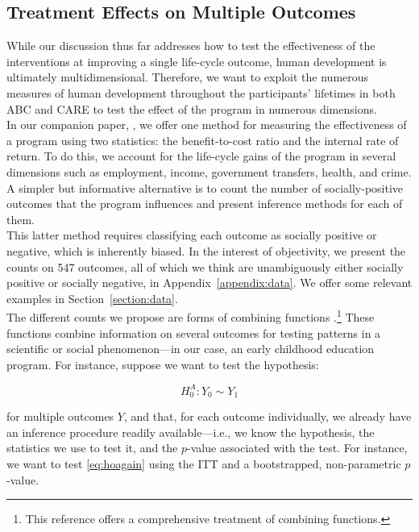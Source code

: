 \subsection{Treatment Effects on Multiple Outcomes}

\noindent While our discussion thus far addresses how to test the effectiveness of the interventions at improving a single life-cycle outcome, human development is ultimately multidimensional. Therefore, we want to exploit the numerous measures of human development throughout the participants' lifetimes in both ABC and CARE to test the effect of the program in numerous dimensions. \\

\noindent In our companion paper, \citet{Elango_et_al_2015_ABC_unpublished}, we offer one method for measuring the effectiveness of a program using two statistics: the benefit-to-cost ratio and the internal rate of return. To do this, we account for the life-cycle gains of the program in several dimensions such as employment, income, government transfers, health, and crime. A simpler but informative alternative is to count the number of socially-positive outcomes that the program influences and present inference methods for each of them.\\

\noindent This latter method requires classifying each outcome as socially positive or negative, which is inherently biased. In the interest of objectivity, we present the counts on 547 outcomes, all of which we think are unambiguously either socially positive or socially negative, in Appendix~\ref{appendix:data}. We offer some relevant examples in Section~\ref{section:data}.\\

\noindent The different counts we propose are forms of combining functions \citep{Pesarin_Salmaso_2010_PermutationTests}.\footnote{This reference offers a comprehensive treatment of combining functions.} These functions combine information on several outcomes for testing patterns in a scientific or social phenomenon---in our case, an early childhood education program. For instance, suppose we want to test the hypothesis: 

\begin{equation}
H_{0}^A: Y_{0} \sim Y_{1} \label{eq:hoagain}
\end{equation}

\noindent for multiple outcomes $Y$, and that, for each outcome individually, we already have an inference procedure readily available---i.e., we know the hypothesis, the statistics we use to test it, and the $p$-value associated with the test. For instance, we want to test \eqref{eq:hoagain} using the ITT and a bootstrapped, non-parametric $p$-value.\\

